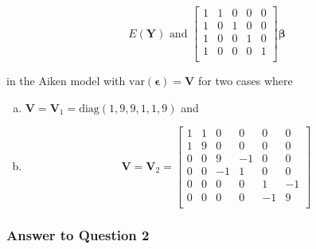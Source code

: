 \documentclass[paper=a4, fontsize=11pt]{scrartcl} %
\newcommand{\vecBeta}{\mathbf{\beta}}
\newcommand{\vecEpsilon}{\mathbf{\epsilon}}
\newcommand{\matV}{\mathbf{V}}
\newcommand{\matY}{\mathbf{Y}}
\begin{document}
$$
E (\matY)  \text{ \  and \  } 
\begin{bmatrix} 1 & 1 & 0 & 0 & 0 \\
                             1 & 0 & 1 & 0 & 0 \\
                             1 & 0 & 0 & 1 & 0 \\
                             1 & 0 & 0 & 0 & 1 \\
\end{bmatrix}
\vecBeta
$$

in the Aiken model with $\text{var}(\vecEpsilon) = \matV$ for two cases where

\begin{enumerate}[(a)]
\item $\matV = \matV_1 = \text{diag}(1, 9, 9, 1, 1, 9)$ and
\item 
$$
\matV = \matV_2 = 
\begin{bmatrix} 1 & 1 & 0 & 0 & 0 & 0 \\
                             1 & 9 & 0 & 0 & 0 & 0 \\
                             0 & 0 & 9 & -1 & 0 & 0 \\
                             0 & 0 & -1 & 1 & 0 & 0 \\
                             0 & 0 & 0 & 0 & 1 & -1 \\
                             0 & 0 & 0 & 0 & -1 & 9 \\
\end{bmatrix}
$$
\end{enumerate}

\bigskip
\subsubsection*{Answer to Question 2}
\end{document}
